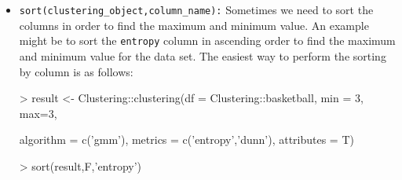 \begin{itemize}
  \item \texttt{sort(clustering\_object,column\_name):} Sometimes we need to sort the columns in order to find the maximum and minimum value. An example might be to sort the \texttt{entropy} column in ascending order to find the maximum and minimum value for the data set. The easiest way to perform the sorting by column is as follows:
  \begin{Schunk}
\begin{Sinput}
> result <- Clustering::clustering(df = Clustering::basketball, min = 3, max=3,
\end{Sinput}
\begin{Sinput}
           algorithm = c('gmm'), metrics = c('entropy','dunn'), attributes = T)
 \end{Sinput}
\end{Schunk}
\begin{Schunk}
\begin{Sinput}
>  sort(result,F,'entropy')
\end{Sinput}
\end{Schunk}


\end{itemize}
